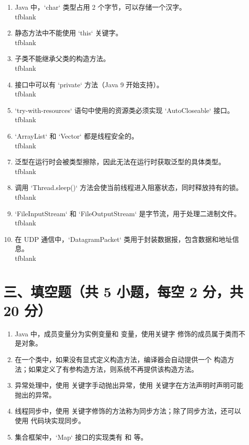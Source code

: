 \documentclass[a3paper, landscape, 11pt, twocolumn]{article}
\newcommand{\blank}{\underline{\hspace{2em}}}
\newcommand{\tfblank}{\underline{\hspace{1.5em}}}
\begin{document}
\begin{enumerate}[label=\arabic*., itemsep=0.5em]
	\item Java 中，`char` 类型占用 2 个字节，可以存储一个汉字。 \\tfblank
	\item 静态方法中不能使用 `this` 关键字。 \\tfblank
	\item 子类不能继承父类的构造方法。 \\tfblank
	\item 接口中可以有 `private` 方法（Java 9 开始支持）。 \\tfblank
	\item `try-with-resources` 语句中使用的资源类必须实现 `AutoCloseable` 接口。 \\tfblank
	\item `ArrayList` 和 `Vector` 都是线程安全的。 \\tfblank
	\item 泛型在运行时会被类型擦除，因此无法在运行时获取泛型的具体类型。 \\tfblank
	\item 调用 `Thread.sleep()` 方法会使当前线程进入阻塞状态，同时释放持有的锁。 \\tfblank
	\item `FileInputStream` 和 `FileOutputStream` 是字节流，用于处理二进制文件。 \\tfblank
	\item 在 UDP 通信中，`DatagramPacket` 类用于封装数据报，包含数据和地址信息。 \\tfblank
\end{enumerate}

\vspace{0.5cm}

\section*{三、填空题（共 5 小题，每空 2 分，共 20 分）}

\begin{enumerate}[label=\arabic*., itemsep=1em]
	\item Java 中，成员变量分为实例变量和 \blank 变量，使用关键字 \blank 修饰的成员属于类而不是对象。
	\item 在一个类中，如果没有显式定义构造方法，编译器会自动提供一个 \blank 构造方法；如果定义了有参构造方法，则系统不再提供该构造方法。
	\item 异常处理中，使用 \blank 关键字手动抛出异常，使用 \blank 关键字在方法声明时声明可能抛出的异常。
	\item 线程同步中，使用 \blank 关键字修饰的方法称为同步方法；除了同步方法，还可以使用 \blank 代码块实现同步。
	\item 集合框架中，`Map` 接口的实现类有 \blank 和 \blank 等。
\end{enumerate}
\end{document}
